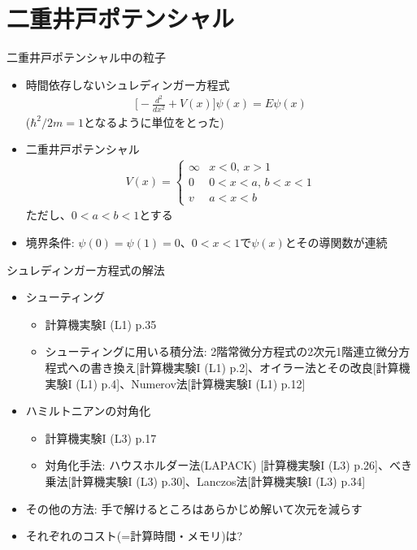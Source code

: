 \section{二重井戸ポテンシャル}

\begin{frame}[t,fragile]{二重井戸ポテンシャル中の粒子}
  \begin{itemize}
  \item 時間依存しないシュレディンガー方程式
    \begin{align*}
      \big[ -\frac{d^2}{dx^2} + V(x) \big] \psi(x) = E \psi(x)
    \end{align*}
    ($\hbar^2/2m = 1$となるように単位をとった)
  \item 二重井戸ポテンシャル
    \begin{align*}
      V(x) = \begin{cases}
        \infty & \text{$x < 0$, $x > 1$} \\
        0 & \text{$0 < x < a$, $b < x < 1$} \\
        v & \text{$a < x < b$}
      \end{cases}
    \end{align*}
    ただし、$0<a<b<1$とする
  \item 境界条件: $\psi(0) = \psi(1) = 0$、$0 < x < 1$で$\psi(x)$とその導関数が連続
  \end{itemize}
\end{frame}

\begin{frame}[t,fragile]{シュレディンガー方程式の解法}
  \begin{itemize}
  \item シューティング
    \begin{itemize}
    \item 計算機実験I (L1) p.35
    \item シューティングに用いる積分法: 2階常微分方程式の2次元1階連立微分方程式への書き換え[計算機実験I (L1) p.2]、オイラー法とその改良[計算機実験I (L1) p.4]、Numerov法[計算機実験I (L1) p.12]
    \end{itemize}
  \item ハミルトニアンの対角化
    \begin{itemize}
    \item 計算機実験I (L3) p.17
    \item 対角化手法: ハウスホルダー法(LAPACK) [計算機実験I (L3) p.26]、べき乗法[計算機実験I (L3) p.30]、Lanczos法[計算機実験I (L3) p.34]
    \end{itemize}
  \item その他の方法: 手で解けるところはあらかじめ解いて次元を減らす
  \item それぞれのコスト(=計算時間・メモリ)は?
  \end{itemize}
\end{frame}
